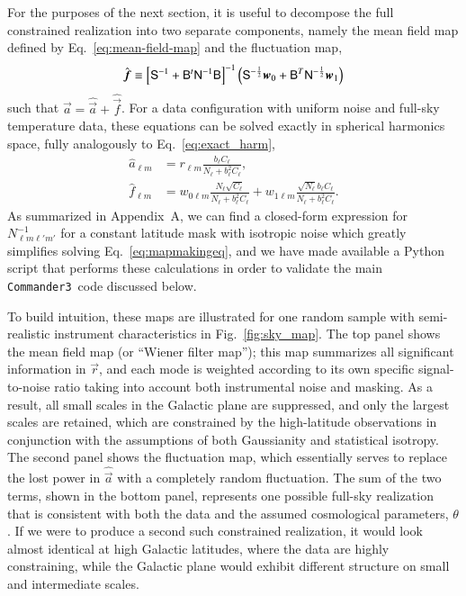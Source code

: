 \documentclass[twocolumn]{../common/aa}
\def\commanderthree{\texttt{Commander3}}
\newcommand{\B}[0]{\tens{B}}
\renewcommand{\a}[0]{\vec{a}}
\newcommand{\f}[0]{\vec{f}}
\newcommand{\N}[0]{\tens{N}}
\newcommand{\w}[0]{\vec{w}}
\renewcommand{\S}[0]{\tens{S}}
\renewcommand{\r}[0]{\vec{r}}
\begin{document}
For the purposes of the next section, it is useful to decompose the full constrained realization into two separate components, namely the mean field map defined by Eq.~\eqref{eq:mean-field-map} and the fluctuation map, 
\begin{equation}
\label{eq:fluc-map}
\hat{\f} \equiv \left[\S^{-1} + \B^t \N^{-1}\B \right]^{-1} \left(\S^{-\frac{1}{2}}\w_0 +\B^T \N^{-\frac{1}{2}}\w_1 \right)
\end{equation}
such that $\a = \hat{\a} + \hat{\f}$. For a data configuration with uniform noise and full-sky temperature data, these equations can be solved exactly in spherical harmonics space, fully analogously to Eq.~\eqref{eq:exact_harm},
\begin{align}
    \label{eq:hat_s_approx}
    \hat{a}_{\ell m} &= r_{\ell m}\frac{b_{\ell}C_{\ell}}{N_\ell + b_{\ell}^2C_{\ell}},\\
    \label{eq:hat_f_approx}
    \hat{f}_{\ell m} &= w_{0\ell m}\frac{N_{\ell}\sqrt{C_{\ell}}}{N_\ell + b_{\ell}^2C_{\ell}}+w_{1\ell m}\frac{\sqrt{N_{\ell}}b_{\ell}C_\ell}{N_\ell + b_{\ell}^2C_{\ell}}.
\end{align}
As summarized in Appendix~A, we can find a closed-form expression for $N_{\ell m\ell'm'}^{-1}$ for a constant latitude mask with isotropic noise which greatly simplifies solving Eq.~\eqref{eq:mapmakingeq}, and we have made available a Python script that performs these calculations in order to validate the main \commanderthree\ code discussed below.

To build intuition, these maps are illustrated for one random sample with semi-realistic instrument characteristics in Fig.~\ref{fig:sky_map}. The top panel shows the mean field map (or ``Wiener filter map''); this map summarizes all significant information in $\r$, and each mode is weighted according to its own specific signal-to-noise ratio taking into account both instrumental noise and masking. As a result, all small scales in the Galactic plane are suppressed, and only the largest scales are retained, which are constrained by the high-latitude observations in conjunction with the assumptions of both Gaussianity and statistical isotropy. The second panel shows the fluctuation map, which essentially serves to replace the lost power in $\hat{\a}$ with a completely random fluctuation. The sum of the two terms, shown in the bottom panel, represents one possible full-sky realization that is consistent with both the data and the assumed cosmological parameters, $\theta$. If we were to produce a second such constrained realization, it would look almost identical at high Galactic latitudes, where the data are highly constraining, while the Galactic plane would exhibit different structure on small and intermediate scales.
\end{document}
